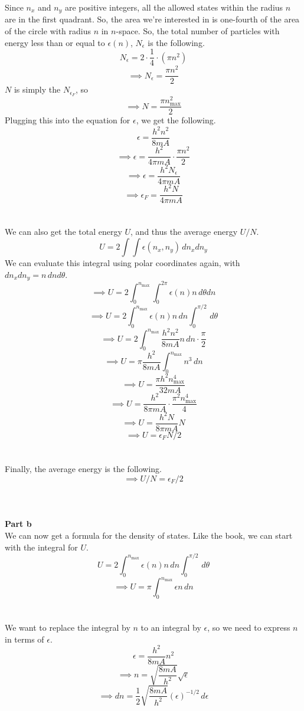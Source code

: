 \documentclass[12pt]{article}
\begin{document}
\begin{flushleft}
Since $n_x$ and $n_y$ are positive integers, all the allowed states within the radius $n$ are in the first quadrant.
So, the area we're interested in is one-fourth of the area of the circle with radius $n$ in $n$-space.
So, the total number of particles with energy less than or equal to $\epsilon(n)$, $N_\epsilon$ is the following.
$$N_\epsilon=2\cdot\frac{1}{4}\cdot(\pi n^2)$$
$$\implies N_\epsilon=\frac{\pi n^2}{2}$$
$N$ is simply the $N_{\epsilon_F}$, so
$$\implies N=\frac{\pi n_\text{max}^2}{2}$$
Plugging this into the equation for $\epsilon$, we get the following.
$$\epsilon=\frac{h^2n^2}{8mA}$$
$$\implies\epsilon=\frac{h^2}{4\pi mA}\cdot\frac{\pi n^2}{2}$$
$$\implies\epsilon=\frac{h^2N_\epsilon}{4\pi mA}$$
$$\implies\epsilon_F=\frac{h^2N}{4\pi mA}$$\\~\\

We can also get the total energy $U$, and thus the average energy $U/N$.
$$U=2\int\int\epsilon(n_x, n_y)\,dn_xdn_y$$
We can evaluate this integral using polar coordinates again, with $dn_xdn_y=n\,dnd\theta$.
$$\implies U=2\int_0^{n_\text{max}}\int_0^{2\pi}\epsilon(n)n\,d\theta dn$$
$$\implies U=2\int_0^{n_\text{max}}\epsilon(n)n\,dn\int_0^{\pi/2}\,d\theta$$
$$\implies U=2\int_0^{n_\text{max}}\frac{h^2n^2}{8mA}n\,dn\cdot\frac{\pi}{2}$$
$$\implies U=\pi\frac{h^2}{8mA}\int_0^{n_\text{max}}n^3\,dn$$
$$\implies U=\frac{\pi h^2n_\text{max}^4}{32mA}$$
$$\implies U=\frac{h^2}{8\pi mA}\cdot\frac{\pi^2 n_\text{max}^4}{4}$$
$$\implies U=\frac{h^2N}{8\pi mA}N$$
$$\implies U=\epsilon_FN/2$$\\~\\

Finally, the average energy is the following.
$$\implies U/N=\epsilon_F/2$$\\~\\~\\


\textbf{Part b}\\
We can now get a formula for the density of states.
Like the book, we can start with the integral for $U$.
$$U=2\int_0^{n_\text{max}}\epsilon(n)n\,dn\int_0^{\pi/2}\,d\theta$$
$$\implies U=\pi\int_0^{n_\text{max}}\epsilon n\,dn$$\\~\\

We want to replace the integral by $n$ to an integral by $\epsilon$, so we need to express $n$ in terms of $\epsilon$.
$$\epsilon=\frac{h^2}{8mA}n^2$$
$$\implies n=\sqrt{\frac{8mA}{h^2}}\sqrt{\epsilon}$$
$$\implies dn=\frac{1}{2}\sqrt{\frac{8mA}{h^2}}(\epsilon)^{-1/2}\,d\epsilon$$\\~\\


\end{flushleft}
\end{document}
